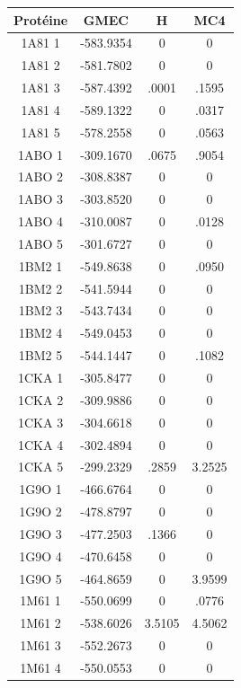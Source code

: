 \documentclass[a4paper,12pt]{article}
\begin{document}
    \begin{table}[!htbp]
      \centering

      \begin{tabular}{|c|c|c|c|}

        \hline
        Protéine & GMEC & H & MC4 \\
        \hline
        1A81 1 & -583.9354 & 0 & 0 \\
        1A81 2 & -581.7802 & 0 & 0 \\
        1A81 3 & -587.4392 & .0001 & .1595 \\
        1A81 4 & -589.1322 & 0 & .0317 \\
        1A81 5 & -578.2558 & 0 & .0563 \\
        1ABO 1 & -309.1670 & .0675 & .9054 \\
        1ABO 2 & -308.8387 & 0 & 0 \\
        1ABO 3 & -303.8520 & 0 & 0 \\
        1ABO 4 & -310.0087 & 0 & .0128 \\
        1ABO 5 & -301.6727 & 0 & 0 \\
        1BM2 1 & -549.8638 & 0 & .0950 \\
        1BM2 2 & -541.5944 & 0 & 0 \\
        1BM2 3 & -543.7434 & 0 & 0 \\
        1BM2 4 & -549.0453 & 0 & 0 \\
        1BM2 5 & -544.1447 & 0 & .1082 \\
        1CKA 1 & -305.8477 & 0 & 0 \\
        1CKA 2 & -309.9886 & 0 & 0 \\
        1CKA 3 & -304.6618 & 0 & 0 \\
        1CKA 4 & -302.4894 & 0 & 0 \\
        1CKA 5 & -299.2329 & .2859 & 3.2525 \\
        1G9O 1 & -466.6764 & 0 & 0 \\
        1G9O 2 & -478.8797 & 0 & 0 \\
        1G9O 3 & -477.2503 & .1366 & 0 \\
        1G9O 4 & -470.6458 & 0 & 0 \\
        1G9O 5 & -464.8659 & 0 & 3.9599 \\
        1M61 1 & -550.0699 & 0 & .0776 \\
        1M61 2 & -538.6026 & 3.5105 & 4.5062 \\
        1M61 3 & -552.2673 & 0 & 0 \\
        1M61 4 & -550.0553 & 0 & 0 \\

\end{tabular}
\end{table}
\end{document}
